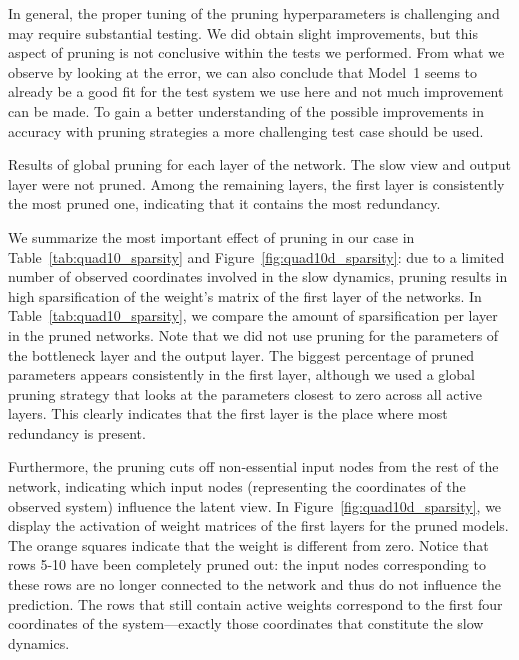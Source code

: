 \documentclass{article}
\begin{document}
In general, the proper tuning of the pruning hyperparameters is challenging and may require substantial testing. We did obtain slight improvements, but this aspect of pruning is not conclusive within the tests we performed. From what we observe by looking at the error, we can also conclude that Model~1 seems to already be a good fit for the test system we use here and not much improvement can be made. To gain a better understanding of the possible improvements in accuracy with pruning strategies a more challenging test case should be used. 

\begin{table}
    \centering
    \medskip

    \caption{Results of global pruning for each layer of the network. The slow view and output layer were not pruned. Among the remaining layers, the first layer is consistently the most pruned one, indicating that it contains the most redundancy.}
    \label{tab:quad10_sparsity}
\end{table}

We summarize the most important effect of pruning in our case in Table~\ref{tab:quad10_sparsity} and Figure~\ref{fig:quad10d_sparsity}: due to a limited number of observed coordinates involved in the slow dynamics, pruning results in high sparsification of the weight's matrix of the first layer of the networks. In Table~\ref{tab:quad10_sparsity}, we compare the amount of sparsification per layer in the pruned networks. Note that we did not use pruning for the parameters of the bottleneck layer and the output layer. The biggest percentage of pruned parameters appears consistently in the first layer, although we used a global pruning strategy that looks at the parameters closest to zero across all active layers. This clearly indicates that the first layer is the place where most redundancy is present.

Furthermore, the pruning cuts off non-essential input nodes from the rest of the network, indicating which input nodes (representing the coordinates of the observed system) influence the latent view. In Figure~\ref{fig:quad10d_sparsity}, we display the activation of weight matrices of the first layers for the pruned models. The orange squares indicate that the weight is different from zero. Notice that rows 5-10 have been completely pruned out: the input nodes corresponding to these rows are no longer connected to the network and thus do not influence the prediction. The rows that still contain active weights correspond to the first four coordinates of the system---exactly those coordinates that constitute the slow dynamics.
\end{document}
